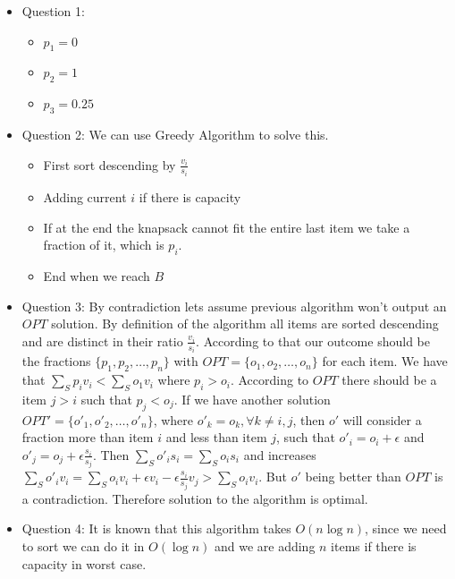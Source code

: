 \documentclass[12pt, a4paper]{article}
\begin{document}
\begin{itemize}
  \item Question 1: 
  \begin{itemize}
    \item $p_1 = 0$
    \item $p_2 = 1$
    \item $p_3 = 0.25$
  \end{itemize}
  \item Question 2: We can use Greedy Algorithm to solve this. 
  \begin{itemize}
    \item First sort descending by $\frac{v_i}{s_i}$
    \item Adding current $i$ if there is capacity
    \item If at the end the knapsack cannot fit the entire last item we take a fraction of it, which is $p_i$.
    \item End when we reach $B$
  \end{itemize}
  \item Question 3: By contradiction lets assume previous algorithm won't output an $OPT$ solution. By definition of the algorithm all items are sorted descending and are distinct in their ratio $\frac{v_i}{s_i}$. According to that our outcome should be the fractions $\{p_1, p_2, \dots, p_n\}$ with $OPT = \{o_1, o_2, \dots, o_n\}$ for each item. 
  We have that $\sum_S p_iv_i < \sum_S o_1v_i$ where $p_i > o_i$. According to $OPT$ there should be a item $j > i$ such that $p_j < o_j$. If we have another solution $OPT' = \{o'_1, o'_2, \dots, o'_n\}$, where $o'_k = o_k, \forall k \neq i,j$, then $o'$ will consider a fraction more than item $i$ and less than item $j$, such that $o'_i = o_i + \epsilon$ and $o'_j = o_j + \epsilon \frac{s_i}{s_j}$. Then $\sum_S o'_is_i = \sum_S o_is_i$ and increases $\sum_S o'_iv_i = \sum_S o_iv_i + \epsilon v_i - \epsilon \frac{s_i}{s_j} v_j > \sum_S o_iv_i$. But $o'$ being better than $OPT$ is a contradiction. Therefore solution to the algorithm is optimal.
  \item Question 4: It is known that this algorithm takes $O(n \log{n})$, since we need to sort we can do it in $O(\log{n})$ and we are adding $n$ items if there is capacity in worst case.
\end{itemize}
\end{document}
